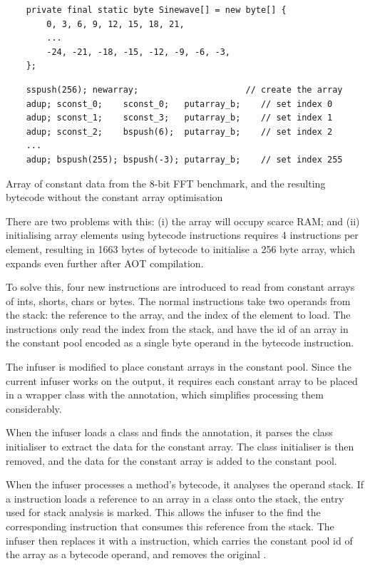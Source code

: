 \begin{listing}
\begin{verbatim}
    private final static byte Sinewave[] = new byte[] {
        0, 3, 6, 9, 12, 15, 18, 21,
        ...
        -24, -21, -18, -15, -12, -9, -6, -3, 
    };
\end{verbatim}
\begin{verbatim}
    sspush(256); newarray;                     // create the array
    adup; sconst_0;    sconst_0;   putarray_b;    // set index 0
    adup; sconst_1;    sconst_3;   putarray_b;    // set index 1
    adup; sconst_2;    bspush(6);  putarray_b;    // set index 2
    ...
    adup; bspush(255); bspush(-3); putarray_b;    // set index 255
\end{verbatim}
\caption{Array of constant data from the 8-bit FFT benchmark, and the resulting bytecode without the constant array optimisation}
\label{lst-constant-array-initialisation}
\end{listing}


There are two problems with this: (i) the array will occupy scarce RAM; and (ii) initialising array elements using bytecode instructions requires 4 instructions per element, resulting in 1663 bytes of bytecode to initialise a 256 byte array, which expands even further after AOT compilation.

To solve this, four new  instructions are introduced to read from constant arrays of ints, shorts, chars or bytes. The normal  instructions take two operands from the stack: the reference to the array, and the index of the element to load. The  instructions only read the index from the stack, and have the id of an array in the constant pool encoded as a single byte operand in the bytecode instruction.

The infuser is modified to place constant arrays in the constant pool. Since the current infuser works on the  output, it requires each constant array to be placed in a wrapper class with the  annotation, which simplifies processing them considerably.

When the infuser loads a class and finds the  annotation, it parses the  class initialiser to extract the data for the constant array. The class initialiser is then removed, and the data for the constant array is added to the constant pool.

When the infuser processes a method's bytecode, it analyses the operand stack. If a  instruction loads a reference to an array in a  class onto the stack, the entry used for stack analysis is marked. This allows the infuser to the find the corresponding  instruction that consumes this reference from the stack. The infuser then replaces it with a  instruction, which carries the constant pool id of the array as a bytecode operand, and removes the original .

